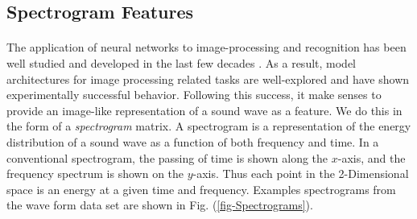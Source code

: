 \documentclass[12pt,letterpaper]{article}
\begin{document}

\newpage

\subsection{Spectrogram Features}
\label{subsec-Spectrogram}

\paragraph*{}The application of neural networks to image-processing and recognition has been well studied and developed in the last few decades \cite{Geron,Goodfellow,Loy,Mierswa}. As a result, model architectures for image processing related tasks are well-explored and have shown experimentally successful behavior. Following this success, it make senses to provide an image-like representation of a sound wave as a feature. We do this in the form of a \textit{spectrogram} matrix. A spectrogram is a representation of the energy distribution of a sound wave as a function of both frequency and time. In a conventional spectrogram, the passing of time is shown along the $x$-axis, and the frequency spectrum is shown on the $y$-axis. Thus each point in the 2-Dimensional space is an energy at a given time and frequency. Examples spectrograms from the wave form data set are shown in Fig. (\ref{fig-Spectrograms}).
\end{document}
